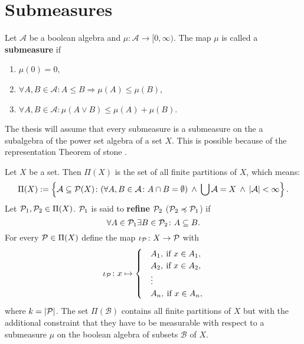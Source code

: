 \section{Submeasures}\label{appendixA}

\begin{defin}
  Let $\mathcal{A}$ be a boolean algebra and $\mu\colon \mathcal{A} \to [0, \infty)$. The map $\mu$ is called a \textbf{submeasure} if
  \begin{enumerate}[label=\roman*.)]
    \item $\mu(0) = 0$,
    \item $\forall A, B \in \mathcal{A}\colon A \leq B \Rightarrow \mu(A) \leq \mu(B)$,
    \item $\forall A, B \in \mathcal{A}\colon \mu(A \lor B) \leq \mu(A) + \mu(B)$.\qedhere
  \end{enumerate}
\end{defin}

The thesis will assume that every submeasure is a submeasure on the a subalgebra of the power set algebra of a set $X$. This is possible because of the representation Theorem of stone \cite{stone}.

\begin{defin}
  Let $X$ be a set. Then $\Pi(X)$ is the set of all finite partitions of $X$, which means:
  \begin{equation*}
    \Pi(X) := \left\{ \mathcal{A} \subseteq \P(X)\colon (\forall A,B \in \mathcal{A}\colon A \cap B = \emptyset) \: \land \: \bigcup\mathcal{A} = X \: \land \: \left| \mathcal{A} \right| < \infty \right\}.
  \end{equation*}
  Let $\P_1, \P_2 \in \Pi(X)$. $\P_1$ is said to \textbf{refine} $\P_2$ ($\P_2 \preccurlyeq \P_1$) if
  \begin{equation*}
    \forall A \in \P_1\exists B \in \P_2\colon A \subseteq B.
  \end{equation*}
  For every $\P \in \Pi(X)$ define the map $\iota_\P\colon X \to \P$ with
  \begin{equation*}
    \iota_\P\colon x \mapsto \begin{cases}
      &A_1, \: \text{if } x \in A_1, \\
      &A_2, \: \text{if } x \in A_2, \\
      &\vdots \\
      &A_n, \: \text{if } x \in A_n,
    \end{cases}
  \end{equation*}
  where $k = \left|\P\right|$.    
  The set $\Pi(\mathcal{B})$ contains all finite partitions of $X$ but with the additional constraint that they have to be measurable with respect to a submeasure $\mu$ on the boolean algebra of subsets $\mathcal{B}$ of $X$. 
\end{defin}

